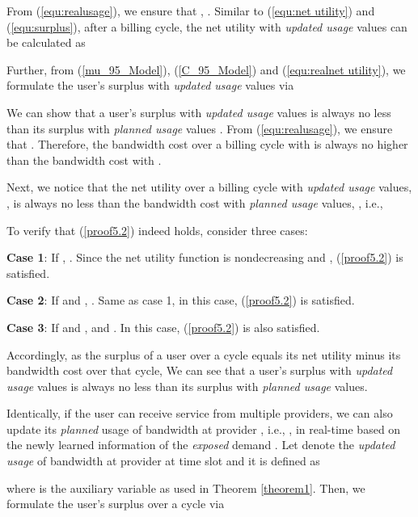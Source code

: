 \documentclass[10pt,journal,compsoc]{IEEEtran}
\begin{document}
From (\ref{equ:realusage}), we ensure that , . Similar to (\ref{equ:net utility}) and (\ref{equ:surplus}), after a billing cycle, the  net utility with \emph{updated usage} values  can be calculated as

Further, from  (\ref{mu_95_Model}), (\ref{C_95_Model})  and (\ref{equ:realnet utility}), we formulate the user's  surplus  with \emph{updated usage} values  via


We can show that a user's surplus with \emph{updated usage} values  is always no less than its surplus with \emph{planned usage} values .
From  (\ref{equ:realusage}), we ensure that
.
Therefore, the bandwidth cost over a billing cycle with   is always no higher than the bandwidth cost with  .
\noindent

Next, we notice that the net utility over a billing cycle with \emph{updated usage} values, , is always no less than the bandwidth cost with \emph{planned usage} values, , i.e.,


\noindent To verify that (\ref{proof5.2}) indeed holds,  consider three cases:

\noindent
\textbf{Case 1}: If , . Since the net utility function  is nondecreasing and , (\ref{proof5.2}) is satisfied.
 
\noindent
\textbf{Case 2}: If  and , . Same as case 1, in this case,  (\ref{proof5.2}) is  satisfied.

\noindent
\textbf{Case 3}: If  and ,  and . In this case, (\ref{proof5.2}) is also satisfied.

\noindent


Accordingly, as the surplus of a user over a  cycle equals its net utility minus its bandwidth cost over that cycle, We can see that a user's surplus with \emph{updated usage} values is always no less than its surplus with \emph{planned usage} values. 









\vspace{0.1cm}

Identically, if the user can receive service from multiple providers, we can also update its \emph{planned} usage of bandwidth at provider , i.e., , in real-time based on the newly learned information of the  \emph{exposed} demand . Let  denote the \emph{updated usage} of bandwidth at provider  at time slot  and it is defined as

where  is the auxiliary variable as used in Theorem \ref{theorem1}. Then, we formulate the user's   surplus over a  cycle  via
\end{document}
